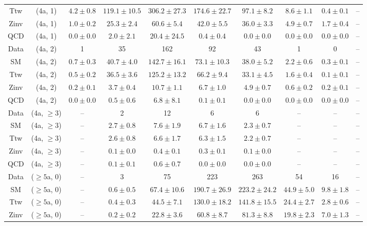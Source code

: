 \begin{table}[h!]
{\begin{tabular}{cccccccccc}
	Ttw & (4a, 1) & $4.2\pm 0.8$ & $119.1\pm 10.5$ & $306.2\pm 27.3$ & $174.6\pm 22.7$ & $97.1\pm 8.2$ & $8.6\pm 1.1$ & $0.4\pm 0.1$ & -- \\[0.5ex] 
	Zinv & (4a, 1) & $1.0\pm 0.2$ & $25.3\pm 2.4$ & $60.6\pm 5.4$ & $42.0\pm 5.5$ & $36.0\pm 3.3$ & $4.9\pm 0.7$ & $1.7\pm 0.4$ & -- \\[0.5ex] 
	QCD & (4a, 1) & $0.0\pm 0.0$ & $2.0\pm 2.1$ & $20.4\pm 24.5$ & $0.4\pm 0.4$ & $0.0\pm 0.0$ & $0.0\pm 0.0$ & $0.0\pm 0.0$ & -- \\[0.5ex] 
	Data & (4a, 2) & 1 & 35 & 162 & 92 & 43 & 1 & 0 & -- \\[0.5ex] 
	SM & (4a, 2) & $0.7\pm 0.3$ & $40.7\pm 4.0$ & $142.7\pm 16.1$ & $73.1\pm 10.3$ & $38.0\pm 5.2$ & $2.2\pm 0.6$ & $0.3\pm 0.1$ & -- \\[0.5ex] 
	Ttw & (4a, 2) & $0.5\pm 0.2$ & $36.5\pm 3.6$ & $125.2\pm 13.2$ & $66.2\pm 9.4$ & $33.1\pm 4.5$ & $1.6\pm 0.4$ & $0.1\pm 0.1$ & -- \\[0.5ex] 
	Zinv & (4a, 2) & $0.2\pm 0.1$ & $3.7\pm 0.4$ & $10.7\pm 1.1$ & $6.7\pm 1.0$ & $4.9\pm 0.7$ & $0.6\pm 0.2$ & $0.2\pm 0.1$ & -- \\[0.5ex] 
	QCD & (4a, 2) & $0.0\pm 0.0$ & $0.5\pm 0.6$ & $6.8\pm 8.1$ & $0.1\pm 0.1$ & $0.0\pm 0.0$ & $0.0\pm 0.0$ & $0.0\pm 0.0$ & -- \\[0.5ex] 
	Data & (4a, $\ge3$) & -- & 2 & 12 & 6 & 6 & -- & -- & -- \\[0.5ex] 
	SM & (4a, $\ge3$) & -- & $2.7\pm 0.8$ & $7.6\pm 1.9$ & $6.7\pm 1.6$ & $2.3\pm 0.7$ & -- & -- & -- \\[0.5ex] 
	Ttw & (4a, $\ge3$) & -- & $2.6\pm 0.8$ & $6.6\pm 1.7$ & $6.3\pm 1.5$ & $2.2\pm 0.7$ & -- & -- & -- \\[0.5ex] 
	Zinv & (4a, $\ge3$) & -- & $0.1\pm 0.0$ & $0.4\pm 0.1$ & $0.3\pm 0.1$ & $0.1\pm 0.0$ & -- & -- & -- \\[0.5ex] 
	QCD & (4a, $\ge3$) & -- & $0.1\pm 0.1$ & $0.6\pm 0.7$ & $0.0\pm 0.0$ & $0.0\pm 0.0$ & -- & -- & -- \\[0.5ex] 
	Data & ($\ge5$a, 0) & -- & 3 & 75 & 223 & 263 & 54 & 16 & -- \\[0.5ex] 
	SM & ($\ge5$a, 0) & -- & $0.6\pm 0.5$ & $67.4\pm 10.6$ & $190.7\pm 26.9$ & $223.2\pm 24.2$ & $44.9\pm 5.0$ & $9.8\pm 1.8$ & -- \\[0.5ex] 
	Ttw & ($\ge5$a, 0) & -- & $0.4\pm 0.3$ & $44.5\pm 7.1$ & $130.0\pm 18.2$ & $141.8\pm 15.5$ & $24.4\pm 2.7$ & $2.8\pm 0.6$ & -- \\[0.5ex] 
	Zinv & ($\ge5$a, 0) & -- & $0.2\pm 0.2$ & $22.8\pm 3.6$ & $60.8\pm 8.7$ & $81.3\pm 8.8$ & $19.8\pm 2.3$ & $7.0\pm 1.3$ & -- \\[0.5ex] 

\end{tabular}}
\end{table}
